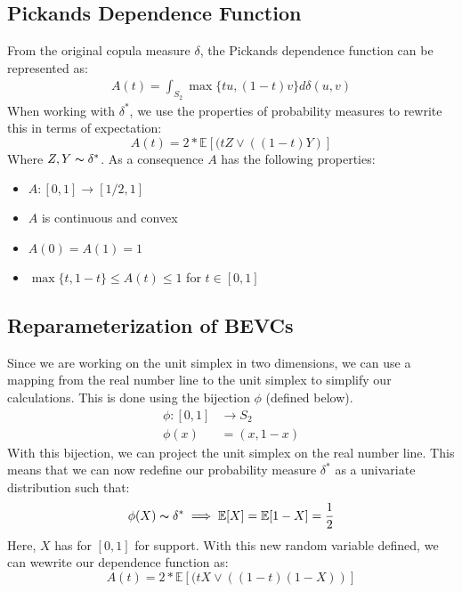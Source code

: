 \documentclass[12pt]{article}
\def\E{\mathbb{E}}
\newcommand{\ds}{\displaystyle}
\theoremstyle{definition}
\theoremstyle{definition}
\begin{document}
\subsection{Pickands Dependence Function}
From the original copula measure $\delta$, the Pickands dependence function can be represented as: 
\begin{align*}
    A(t)=\int_{S_2} \max\{tu,(1-t)v\}d\delta(u,v) 
\end{align*}
When working with $\delta^*$, we use the properties of probability measures to rewrite this in terms of expectation:
$$A(t)=2*\E[(tZ\vee ((1-t)Y)]$$ 
Where $Z,Y\thicksim \delta^*$. As a consequence $A$ has the following properties\cite{bevcart}:
\begin{itemize}
    \item $A:[0,1]\rightarrow[1/2,1]$
    \item $A$ is continuous and convex
    \item $A(0)=A(1)=1$
    \item $\max \{t,1-t\}\leq A(t)\leq 1$ for $t\in[0,1]$
\end{itemize}

\subsection{Reparameterization of BEVCs}
Since we are working on the unit simplex in two dimensions, we can use a mapping from the real number line to the unit simplex to simplify our calculations. This is done using the bijection $\phi$ (defined below).
\begin{align*}
    \ds \phi: [0,1] &\rightarrow S_2\\
    \phi(x)&=(x,1-x)
\end{align*}
With this bijection, we can project the unit simplex on the real number line. This means that we can now redefine our probability measure $\delta^*$ as a univariate distribution such that:
$$\phi(X)\thicksim \delta^* \implies \E[X]=\E[1-X]=\frac{1}{2}$$
Here, $X$ has for $[0,1]$ for support. With this new random variable defined, we can wewrite our dependence function as:
$$A(t)=2* \E[(tX\vee ((1-t)(1-X))]$$
\end{document}
